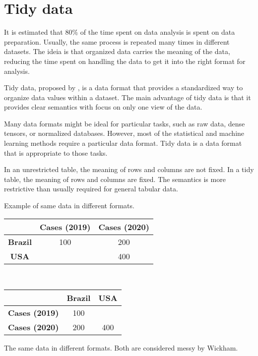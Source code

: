 \section{Tidy data}

It is estimated that 80\% of the time spent on data analysis is spent on data preparation.
Usually, the same process is repeated many times in different datasets. The ideia is that
organized data carries the meaning of the data, reducing the time spent on handling
the data to get it into the right format for analysis.

Tidy data, proposed by \textcite{Wickham2014},
is a data format that provides a standardized way to organize data values within
a dataset.  The main advantage of tidy data is that it provides clear semantics with focus
on only one view of the data.

Many data formats might be ideal for particular tasks, such as raw data, dense tensors, or
normalized databases.  However, most of the statistical and machine learning methods
require a particular data format.  Tidy data is a data format that is appropriate to those
tasks.


In an unrestricted table, the meaning of rows and columns are not fixed.  In a tidy table,
the meaning of rows and columns are fixed.  The semantics is more restrictive than usually
required for general tabular data.

\begin{tablebox}[label=tab:simple-messy]{Example of same data in different formats.}
  \centering
  \begin{tabular}{ccc}
    \toprule
     & \textbf{Cases (2019)} & \textbf{Cases (2020)} \\
    \midrule
    \textbf{Brazil} & 100 & 200 \\
    \textbf{USA} & & 400 \\
    \bottomrule
  \end{tabular}
  \\[1em]
  \begin{tabular}{ccc}
    \toprule
    & \textbf{Brazil} & \textbf{USA} \\
    \midrule
    \textbf{Cases (2019)} & 100 & \\
    \textbf{Cases (2020)} & 200 & 400 \\
    \bottomrule
  \end{tabular}
  \tcblower
  The same data in different formats.  Both are considered messy by Wickham.
\end{tablebox}

